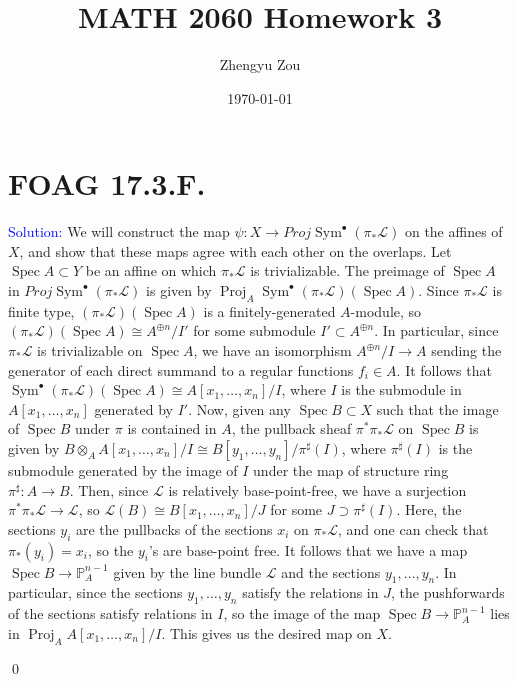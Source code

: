 \documentclass[11pt]{article}
\title{MATH 2060 Homework 3}
\author{Zhengyu Zou}
\date{\today}
\newcommand{\PP}{\mathbb{P}}
\newcommand{\cL}{\mathcal{L}}
\DeclareMathOperator{\Spec}{\operatorname{Spec}}
\newcommand{\Proj}{\operatorname{Proj}}
\newcommand{\PROJ}{\mathit{Proj}}
\newcommand{\Sym}{\operatorname{Sym}}
\newenvironment{solution}{\begin{trivlist}\item[]{\textcolor{blue}{Solution:}}}{\qed \end{trivlist}}
\begin{document}
\maketitle

\section*{FOAG 17.3.F.}

\begin{solution}
    We will construct the map $\psi: X \rightarrow \PROJ \Sym^{\bullet} (\pi_* \cL)$ on the affines of $X$, and show that these maps agree with each other on the overlaps. Let $\Spec A \subset Y$ be an affine on which $\pi_* \cL$ is trivializable. The preimage of $\Spec A$ in $\PROJ \Sym^{\bullet} (\pi_* \cL)$ is given by $\Proj_A \Sym^{\bullet} (\pi_* \cL)(\Spec A)$. Since $\pi_* \cL$ is finite type, $(\pi_* \cL)(\Spec A)$ is a finitely-generated $A$-module, so $(\pi_* \cL)(\Spec A) \cong A^{\oplus n} / I'$ for some submodule $I' \subset A^{\oplus n}$. In particular, since $\pi_* \cL$ is trivializable on $\Spec A$, we have an isomorphism $A^{\oplus n} / I \rightarrow A$ sending the generator of each direct summand to a regular functions $f_i \in A$. It follows that $\Sym^{\bullet} (\pi_* \cL)(\Spec A) \cong A[x_1, \ldots, x_n] / I$, where $I$ is the submodule in $A[x_1, \ldots, x_n]$ generated by $I'$. Now, given any $\Spec B \subset X$ such that the image of $\Spec B$ under $\pi$ is contained in $A$, the pullback sheaf $\pi^*\pi_* \cL$ on $\Spec B$ is given by $B \otimes_A A[x_1, \ldots, x_n] / I \cong B[y_1, \ldots, y_n] / \pi^{\sharp}(I)$, where $\pi^{\sharp}(I)$ is the submodule generated by the image of $I$ under the map of structure ring $\pi^{\sharp}: A \rightarrow B$. Then, since $\cL$ is relatively base-point-free, we have a surjection $\pi^* \pi_* \cL \rightarrow \cL$, so $\cL(B) \cong B[x_1, \ldots, x_n] / J$ for some $J \supset \pi^{\sharp}(I)$. Here, the sections $y_i$ are the pullbacks of the sections $x_i$ on $\pi_* \cL$, and one can check that $\pi_*(y_i) = x_i$, so the $y_i$'s are base-point free. It follows that we have a map $\Spec B \rightarrow \PP_A^{n-1}$ given by the line bundle $\cL$ and the sections $y_1, \ldots, y_n$. In particular, since the sections $y_1, \ldots, y_n$ satisfy the relations in $J$, the pushforwards of the sections satisfy relations in $I$, so the image of the map $\Spec B \rightarrow \PP_A^{n-1}$ lies in $\Proj_A A[x_1, \ldots, x_n] / I$. This gives us the desired map on $X$. 

\end{solution}
\end{document}
